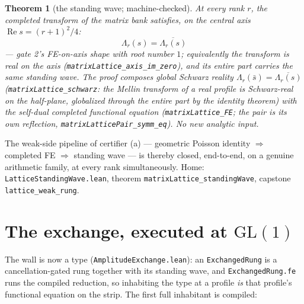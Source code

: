 \documentclass[11pt]{article}
\newtheorem{theorem}{Theorem}
\begin{document}
\begin{theorem}[the standing wave; machine-checked]
At every rank $r$, the completed transform of the matrix bank satisfies, on the
central axis $\operatorname{Re}s=(r+1)^2/4$:
\[
\Lambda_r(s)=\overline{\Lambda_r(s)}
\]
— gate 2's FE-on-axis shape with root number $1$; equivalently the transform is real
on the axis (\texttt{matrixLattice\_axis\_im\_zero}), and its entire part carries the
same standing wave.  The proof composes global Schwarz reality
$\Lambda_r(\bar s)=\overline{\Lambda_r(s)}$ (\texttt{matrixLattice\_schwarz}: the Mellin
transform of a real profile is Schwarz-real on the half-plane, globalized through the
entire part by the identity theorem) with the self-dual completed functional equation
(\texttt{matrixLattice\_FE}; the pair is its own reflection,
\texttt{matrixLatticePair\_symm\_eq}).  No new analytic input.
\end{theorem}

The weak-side pipeline of certifier (a) — geometric Poisson identity $\Rightarrow$ completed FE
$\Rightarrow$ standing wave — is thereby closed, end-to-end, on a genuine arithmetic
family, at every rank simultaneously.  Home: \texttt{LatticeStandingWave.lean}, theorem
\texttt{matrixLattice\_standingWave}, capstone \texttt{lattice\_weak\_rung}.

\section{The exchange, executed at $\mathrm{GL}(1)$}

The wall is now a type (\texttt{AmplitudeExchange.lean}): an \texttt{ExchangedRung}
is a cancellation-gated rung together with its standing wave, and
\texttt{ExchangedRung.fe} runs the compiled reduction, so inhabiting the type at a
profile \emph{is} that profile's functional equation on the strip.  The first full
inhabitant is compiled:
\end{document}
